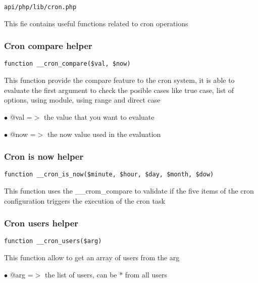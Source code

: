 \documentclass[a4paper]{article}
\begin{document}
\begin{lstlisting}
api/php/lib/cron.php
\end{lstlisting}

This fie contains useful functions related to cron operations

\hypertarget{toc401}{}
\subsubsection{Cron compare helper}

\begin{lstlisting}
function __cron_compare($val, $now)
\end{lstlisting}

This function provide the compare feature to the cron system, it is able to
evaluate the first argument to check the posible cases like true case, list
of options, using module, using range and direct case

\begin{compactitem}
\item[\color{myblue}$\bullet$] @val =$>$ the value that you want to evaluate
\item[\color{myblue}$\bullet$] @now =$>$ the now value used in the evaluation
\end{compactitem}

\hypertarget{toc402}{}
\subsubsection{Cron is now helper}

\begin{lstlisting}
function __cron_is_now($minute, $hour, $day, $month, $dow)
\end{lstlisting}

This function uses the \_\_crom\_compare to validate if the five items of the
cron configuration triggers the execution of the cron task

\hypertarget{toc403}{}
\subsubsection{Cron users helper}

\begin{lstlisting}
function __cron_users($arg)
\end{lstlisting}

This function allow to get an array of users from the arg

\begin{compactitem}
\item[\color{myblue}$\bullet$] @arg =$>$ the list of users, can be * from all users
\end{compactitem}
\end{document}
